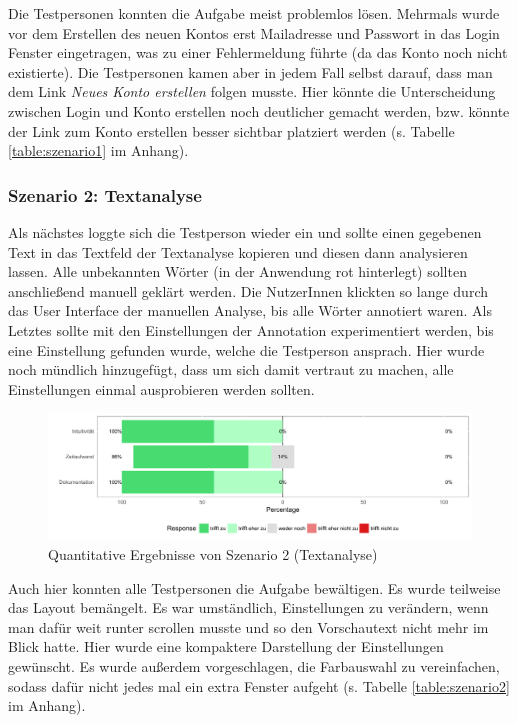 Die Testpersonen konnten die Aufgabe meist problemlos lösen. Mehrmals wurde vor dem Erstellen des neuen Kontos erst Mailadresse und Passwort in das Login Fenster eingetragen, was zu einer Fehlermeldung führte (da das Konto noch nicht existierte). Die Testpersonen kamen aber in jedem Fall selbst darauf, dass man dem Link \textit{Neues Konto erstellen} folgen musste. Hier könnte die Unterscheidung zwischen Login und Konto erstellen noch deutlicher gemacht werden, bzw. könnte der Link zum Konto erstellen besser sichtbar platziert werden (s. Tabelle \ref{table:szenario1} im Anhang).

\subsubsection{Szenario 2: Textanalyse}

Als nächstes loggte sich die Testperson wieder ein und sollte einen gegebenen Text in das Textfeld der Textanalyse kopieren und diesen dann analysieren lassen. Alle unbekannten Wörter (in der Anwendung rot hinterlegt) sollten anschließend manuell geklärt werden. Die NutzerInnen klickten so lange durch das User Interface der manuellen Analyse, bis alle Wörter annotiert waren. Als Letztes sollte mit den Einstellungen der Annotation experimentiert werden, bis eine Einstellung gefunden wurde, welche die Testperson ansprach. Hier wurde noch mündlich hinzugefügt, dass um sich damit vertraut zu machen, alle Einstellungen einmal ausprobieren werden sollten.

\begin{figure}[h!]
	\centering
	\includegraphics[width=.8\linewidth]{figures/evaluation/scenario2}
	\caption{Quantitative Ergebnisse von Szenario 2 (Textanalyse)}
	\label{fig:evaluation-sc2}
\end{figure}

Auch hier konnten alle Testpersonen die Aufgabe bewältigen. Es wurde teilweise das Layout bemängelt. Es war umständlich, Einstellungen zu verändern, wenn man dafür weit runter scrollen musste und so den Vorschautext nicht mehr im Blick hatte. Hier wurde eine kompaktere Darstellung der Einstellungen gewünscht. Es wurde außerdem vorgeschlagen, die Farbauswahl zu vereinfachen, sodass dafür nicht jedes mal ein extra Fenster aufgeht (s. Tabelle \ref{table:szenario2} im Anhang).

